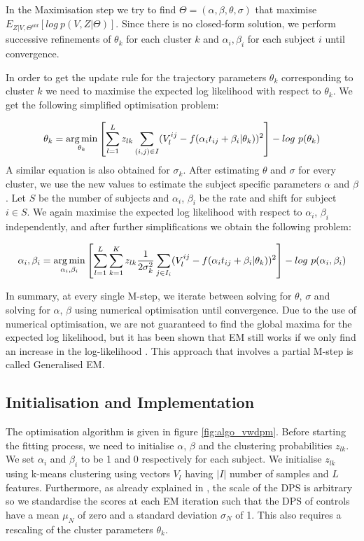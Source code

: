 In the Maximisation step we try to find $\Theta = (\alpha, \beta, \theta, \sigma)$ that maximise $E_{Z|V,\Theta^{old}} [log\ p(V,Z|\Theta)]$. Since there is no closed-form solution, we perform successive refinements of $\theta_k$ for each cluster $k$ and $\alpha_i, \beta_i$ for each subject $i$ until convergence. 

In order to get the update rule for the trajectory parameters $\theta_k$ corresponding to cluster $k$ we need to maximise the expected log likelihood with respect to $\theta_k$. We get the following simplified optimisation problem:

\begin{equation}
 \label{eq:theta}
 \theta_k = \argmin_{\theta_k} \left[\sum_{l=1}^L z_{lk} \sum_{(i,j) \in I} (V_l^{ij} - f(\alpha_i t_{ij} + \beta_i | \theta_k))^2 \right] - log\ p(\theta_k) 
\end{equation}
A similar equation is also obtained for $\sigma_k$. After estimating $\theta$ and $\sigma$ for every cluster, we use the new values to estimate the subject specific parameters $\alpha$ and $\beta$. Let $S$ be the number of subjects and $\alpha_i$, $\beta_i$ be the rate and shift for subject $i \in S$. We again maximise the expected log likelihood with respect to $\alpha_i$, $\beta_i$ independently, and after further simplifications we obtain the following problem:

\begin{equation}
\label{eq:alpha}
 \alpha_i, \beta_i = \operatorname*{arg\,min}_{\alpha_i, \beta_i}  \left[ \sum_{l=1}^L \sum_{k=1}^K z_{lk} \frac{1}{2\sigma_k^2} \sum_{j \in I_i} (V_l^{ij} - f(\alpha_i t_{ij} + \beta_i | \theta_k))^2\right] - log\ p(\alpha_i, \beta_i)
\end{equation}

In summary, at every single M-step, we iterate between solving for $\theta$, $\sigma$ and solving for $\alpha$, $\beta$ using numerical optimisation until convergence. Due to the use of numerical optimisation, we are not guaranteed to find the global maxima for the expected log likelihood, but it has been shown that EM still works if we only find an increase in the log-likelihood \cite{bishop2006pattern}. This approach that involves a partial M-step is called Generalised EM.

\subsection{Initialisation and Implementation}
\label{sec:vwdpm_initialisation}
The optimisation algorithm is given in figure \ref{fig:algo_vwdpm}. Before starting the fitting process, we need to initialise $\alpha$, $\beta$ and the clustering probabilities $z_{lk}$. We set $\alpha_i$ and $\beta_i$ to be 1 and 0 respectively for each subject. We initialise $z_{lk}$ using k-means clustering using vectors $V_l$ having $|I|$ number of samples and $L$ features. Furthermore, as already explained in \cite{jedynak2012}, the scale of the DPS is arbitrary so we standardise the scores at each EM iteration such that the DPS of controls have a mean $\mu_N$ of zero and a standard deviation $\sigma_N$ of 1. This also requires a rescaling of the cluster parameters $\theta_k$.

